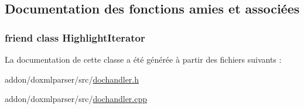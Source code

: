 \subsection{Documentation des fonctions amies et associées}
\hypertarget{class_highlight_handler_a7aed790946df29e2ccac4eaa47911412}{}
\subsubsection[{Highlight\+Iterator}]{\setlength{\rightskip}{0pt plus 5cm}friend class {\bf Highlight\+Iterator}\hspace{0.3cm}{\ttfamily [friend]}}\label{class_highlight_handler_a7aed790946df29e2ccac4eaa47911412}


La documentation de cette classe a été générée à partir des fichiers suivants \+:\begin{DoxyCompactItemize}
\item 
addon/doxmlparser/src/\hyperlink{dochandler_8h}{dochandler.\+h}\item 
addon/doxmlparser/src/\hyperlink{dochandler_8cpp}{dochandler.\+cpp}\end{DoxyCompactItemize}
